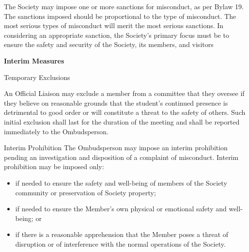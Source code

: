 \begin{longenum}[ label*=\arabic*., align=left]
  The Society  may  impose  one  or  more  sanctions  for  misconduct,  as  per  Bylaw  19.  The  sanctions imposed should be proportional to the type of misconduct. The most serious types of misconduct will  merit  the  most  serious  sanctions.  In  considering  an  appropriate  sanction,  the Society's  primary focus must be to ensure the safety and security of the Society, its members, and visitors
  
  
  
  
  
\item \textbf{Interim Measures}

  \begin{longenum}[ label*=\arabic*., align=left]

      \item Temporary Exclusions
                        
              An Official Liaison may exclude a member from a committee that they oversee if they believe on 
reasonable  grounds  that  the  student’s  continued  presence  is  detrimental  to  good  order  or  will constitute a threat to the safety of others. Such initial exclusion shall last for the duration of the meeting and shall be reported immediately to the Ombudsperson.
   \item Interim Prohibition
 The Ombudsperson may impose an interim prohibition pending an investigation and disposition of a complaint of misconduct. Interim prohibition may be imposed only:
 
  \begin{itemize}
     \item  if needed to ensure the safety and well-being of members of the Society community or preservation of Society property; 
      \item if needed to ensure the Member's own physical or emotional safety and well-being; or 
      \item if there is a reasonable apprehension that the Member poses a threat of disruption or of interference with the normal operations of the Society. 
      \end{itemize}                     
                          

\end{longenum}
\end{longenum}
